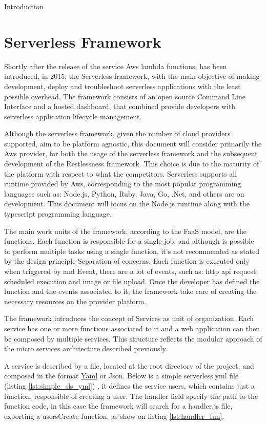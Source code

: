 \begin{chapter}{Introduction}
    \section{Serverless Framework}
    \label{sec:serverless_framework}
    Shortly after the release of the service Aws lambda functions, has been introduced,
    in 2015, the Serverless framework, with the main objective of making development,
    deploy and troubleshoot serverless applications with the least possible overhead.
    The framework consists of an open source Command Line Interface and a hosted
    dashboard, that combined provide developers with serverless application lifecycle
    management.

    Although the serverless framework, given the number of cloud providers supported,
    aim to be platform agnostic, this document will consider primarily the Aws provider,
    for both the usage of the serverless framework and the subsequent development of
    the Restlessness framework. This choice is due to the maturity of the platform with
    respect to what the competitors.
    Serverless supports all runtime provided by Aws, corresponding to the most popular
    programming languages such as: Node.js, Python, Ruby, Java, Go, .Net, and others
    are on development.
    This document will focus on the Node.js runtime along with the typescript
    programming language.

    The main work units of the framework, according to the FaaS model, are the functions.
    Each function is responsible for a single job, and although is possible to perform
    multiple tasks using a single function, it's not recommended as stated by the design
    principle Separation of concerns.
    Each function is executed only when triggered by and Event, there are a lot of events,
    such as: http api request, scheduled execution and image or file upload.
    Once the developer has defined the function and the events associated to it,
    the framework take care of creating the necessary resources on the provider platform.

    The framework introduces the concept of Services as unit of organization. Each service
    has one or more functions associated to it and a web application can then be composed
    by multiple services. This structure reflects the modular approach of the micro services
    architecture described previously.

    A service is described by a file, located at the root directory of the project, and
    composed in the format \href{https://yaml.org/}{Yaml} or Json.
    Below is a simple serverless.yml file (listing \ref{lst:simple_sls_yml})
    , it defines the service users, which
    contains just a function, responsible of creating a user. The handler field specify
    the path to the function code, in this case the framework will search for a handler.js file,
    exporting a usersCreate function, as show on listing \ref{lst:handler_fun}.


\end{chapter}
